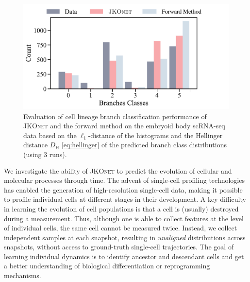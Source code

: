 \begin{figure}[t]
    \includegraphics[width=.5\linewidth]{figures/fig_distribution_cell_types_Branches.pdf}
	\qquad
\caption{Evaluation of cell lineage branch classification performance of \textsc{JKOnet} and the forward method on the embryoid body scRNA-seq data based on the $\ell_1$-distance of the histograms and the Hellinger distance $D_{\mathrm{H}}$ \eqref{eq:hellinger} of the predicted branch class distributions (using 3 runs). \vspace{10pt}}
\label{tab:exp_jkonet_cell_class}
\end{figure}

We investigate the ability of \textsc{JKOnet} to predict the evolution of cellular and molecular processes through time.
The advent of single-cell profiling technologies has enabled the generation of high-resolution single-cell data, making it possible to profile individual cells at different stages in their development. 
A key difficulty in learning the evolution of cell populations is that a cell is (usually)  destroyed during a measurement. Thus, although one is able to collect features at the level of individual cells, the same cell cannot be measured twice. Instead, we collect independent samples at each snapshot, resulting in \emph{unaligned} distributions across snapshots, without access to ground-truth single-cell trajectories. 
The goal of learning individual dynamics is to identify ancestor and descendant cells and get a better understanding of biological differentiation or reprogramming mechanisms. 

